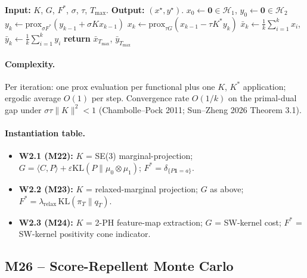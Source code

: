 \begin{algorithmic}[1]
  \STATE \textbf{Input:} $K$, $G$, $F^{\ast}$, $\sigma$, $\tau$, $T_{\max}$.
  \STATE \textbf{Output:} $(x^{\star}, y^{\star})$.
  \STATE $x_{0} \gets \mathbf{0} \in \mathcal{H}_{1}$, $y_{0} \gets \mathbf{0} \in \mathcal{H}_{2}$
    \STATE $y_{k} \gets \mathrm{prox}_{\sigma F^{\ast}}(y_{k-1} + \sigma K x_{k-1})$
    \STATE $x_{k} \gets \mathrm{prox}_{\tau G}(x_{k-1} - \tau K^{\ast} y_{k})$
    \STATE $\bar{x}_{k} \gets \tfrac{1}{k} \sum_{i=1}^{k} x_{i}$,
           $\bar{y}_{k} \gets \tfrac{1}{k} \sum_{i=1}^{k} y_{i}$
  \ENDFOR
  \STATE \textbf{return} $\bar{x}_{T_{\max}}$, $\bar{y}_{T_{\max}}$
\end{algorithmic}

\paragraph{Complexity.}
Per iteration: one $\mathrm{prox}$ evaluation per functional plus
one $K$, $K^{\ast}$ application; ergodic average $O(1)$ per step.
Convergence rate $O(1/k)$ on the primal-dual gap under
$\sigma \tau \|K\|^{2} < 1$ (Chambolle--Pock 2011; Sun--Zheng 2026
Theorem 3.1).

\paragraph{Instantiation table.}
\begin{itemize}
  \item \textbf{W2.1 (M22):}  $K$ = SE(3) marginal-projection;
        $G = \langle C, P \rangle + \varepsilon
        \mathrm{KL}(P \| \mu_{0} \otimes \mu_{1})$;
        $F^{\ast} = \delta_{\{ P \mathbf{1} = a \}}$.
  \item \textbf{W2.2 (M23):}  $K$ = relaxed-marginal projection;
        $G$ as above; $F^{\ast} = \lambda_{\mathrm{relax}}\,
        \mathrm{KL}(\pi_{T} \| q_{T})$.
  \item \textbf{W2.3 (M24):}  $K$ = 2-PH feature-map extraction;
        $G$ = SW-kernel cost; $F^{\ast}$ = SW-kernel positivity
        cone indicator.
\end{itemize}

\subsection*{M26 -- Score-Repellent Monte Carlo}
\label{supp:s2-m26}

